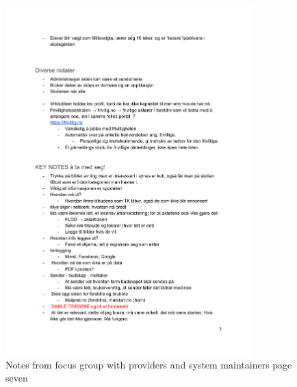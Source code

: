 \begin{figure}[H]
\centering
    \includegraphics[width=0.85\textwidth]{fig/workshop/providers/WSTilbydere_7.pdf}
    \caption{Notes from focus group with providers and system maintainers page seven}
    \label{Provider_7}
\end{figure}

